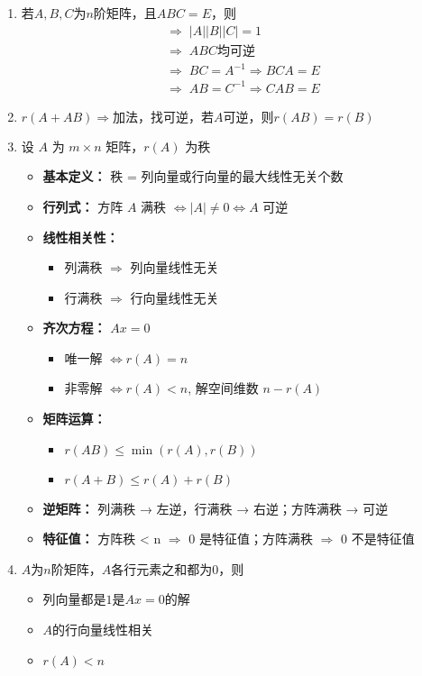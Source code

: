 \documentclass[a4paper,12pt]{article}
\begin{document}
\begin{enumerate}
        \item 若$A, B, C$为$n$阶矩阵，且$ABC = E$，则
        \begin{align*}
            &\Rightarrow\; |A||B||C| = 1 \\
            &\Rightarrow\; A B C\text{均可逆} \\
            &\Rightarrow\; BC = A^{-1} \Rightarrow BCA = E \\
            &\Rightarrow\; AB = C^{-1} \Rightarrow CAB = E
        \end{align*}
        \item $r(A + AB) \Rightarrow \text{加法，找可逆，若}A\text{可逆，则}r(AB) = r(B)$
        \item 设 $A$ 为 $m \times n$ 矩阵，$r(A)$ 为秩
        \begin{itemize}
            \item \textbf{基本定义：} 秩 = 列向量或行向量的最大线性无关个数
            \item \textbf{行列式：} 方阵 $A$ 满秩 $\Leftrightarrow |A| \neq 0 \Leftrightarrow A$ 可逆
            \item \textbf{线性相关性：}
            \begin{itemize}
                \item 列满秩 $\Rightarrow$ 列向量线性无关
                \item 行满秩 $\Rightarrow$ 行向量线性无关
            \end{itemize}
            \item \textbf{齐次方程：} $Ax = 0$
            \begin{itemize}
                \item 唯一解 $\Leftrightarrow r(A) = n$
                \item 非零解 $\Leftrightarrow r(A) < n$, 解空间维数 $n - r(A)$
            \end{itemize}
            \item \textbf{矩阵运算：}
            \begin{itemize}
                \item $r(AB) \le \min(r(A), r(B))$
                \item $r(A+B) \le r(A) + r(B)$
            \end{itemize}
            \item \textbf{逆矩阵：} 列满秩 → 左逆，行满秩 → 右逆；方阵满秩 → 可逆
            \item \textbf{特征值：} 方阵秩 < n $\Rightarrow$ 0 是特征值；方阵满秩 $\Rightarrow$ 0 不是特征值
        \end{itemize}
        \item $A$为$n$阶矩阵，$A$各行元素之和都为$0$，则
        \begin{itemize}
            \item 列向量都是$1$是$Ax = 0$的解
            \item $A$的行向量线性相关
            \item $r(A) < n$
        \end{itemize}
    \end{enumerate}
\end{document}
